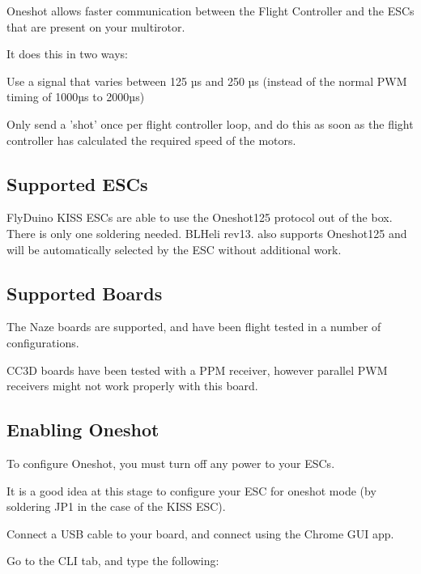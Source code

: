 Oneshot allows faster communication between the Flight Controller and the E\+S\+Cs that are present on your multirotor.

It does this in two ways\+:


\begin{DoxyEnumerate}
\item Use a signal that varies between 125 µs and 250 µs (instead of the normal P\+W\+M timing of 1000µs to 2000µs)
\end{DoxyEnumerate}
\begin{DoxyEnumerate}
\item Only send a 'shot' once per flight controller loop, and do this as soon as the flight controller has calculated the required speed of the motors.
\end{DoxyEnumerate}

\subsection*{Supported E\+S\+Cs}

Fly\+Duino K\+I\+S\+S E\+S\+Cs are able to use the Oneshot125 protocol out of the box. There is only one soldering needed. B\+L\+Heli rev13. also supports Oneshot125 and will be automatically selected by the E\+S\+C without additional work.

\subsection*{Supported Boards}

The Naze boards are supported, and have been flight tested in a number of configurations.

C\+C3\+D boards have been tested with a P\+P\+M receiver, however parallel P\+W\+M receivers might not work properly with this board.

\subsection*{Enabling Oneshot}

To configure Oneshot, you must turn off any power to your E\+S\+Cs.

It is a good idea at this stage to configure your E\+S\+C for oneshot mode (by soldering J\+P1 in the case of the K\+I\+S\+S E\+S\+C).

Connect a U\+S\+B cable to your board, and connect using the Chrome G\+U\+I app.

Go to the C\+L\+I tab, and type the following\+:


